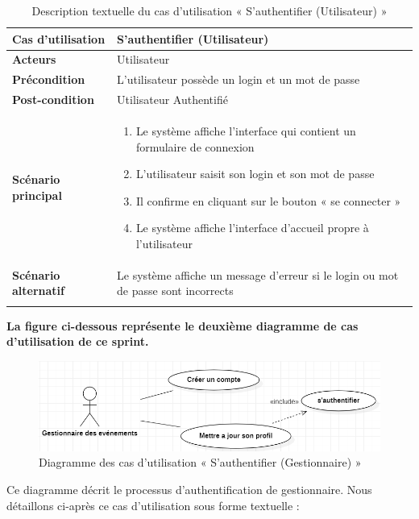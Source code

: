 \begin{longtable}{|>{\bfseries}p{4cm}|p{10cm}|}
\hline
Cas d'utilisation & S'authentifier (Utilisateur) \\
\hline
Acteurs & Utilisateur \\
\hline
Précondition & L'utilisateur possède un login et un mot de passe \\
\hline
Post-condition & Utilisateur Authentifié \\
\hline
Scénario principal & 
\begin{enumerate}
  \item Le système affiche l'interface qui contient un formulaire de connexion
  \item L'utilisateur saisit son login et son mot de passe
  \item Il confirme en cliquant sur le bouton « se connecter »
  \item Le système affiche l'interface d'accueil propre à l'utilisateur
\end{enumerate} \\
\hline
Scénario alternatif & Le système affiche un message d'erreur si le login ou mot de passe sont incorrects \\
\hline
\caption{Description textuelle du cas d'utilisation « S'authentifier (Utilisateur) »}
\end{longtable}

\textbf{La figure ci-dessous représente le deuxième diagramme de cas d'utilisation de ce sprint.}

\begin{figure}[H]
    \centering
    \includegraphics[width=0.6\linewidth]{projet/images/diagramme de sequance/images/gestionnaire.png}
    \caption{Diagramme des cas d'utilisation « S'authentifier (Gestionnaire) »}
    \label{fig:equipe_scrum}
\end{figure}

Ce diagramme décrit le processus d'authentification de gestionnaire. Nous détaillons ci-après ce cas d'utilisation sous forme textuelle :

